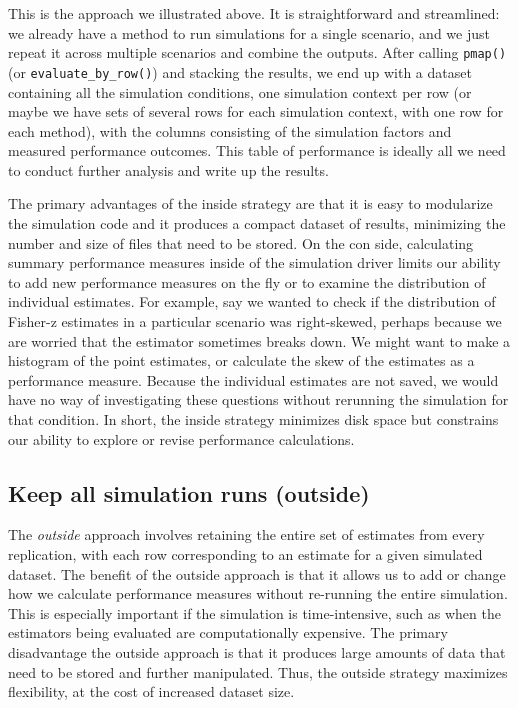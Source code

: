 \documentclass[
]{book}
\begin{document}
This is the approach we illustrated above. It is straightforward and streamlined: we already have a method to run simulations for a single scenario, and we just repeat it across multiple scenarios and combine the outputs.
After calling \texttt{pmap()} (or \texttt{evaluate\_by\_row()}) and stacking the results, we end up with a dataset containing all the simulation conditions, one simulation context per row (or maybe we have sets of several rows for each simulation context, with one row for each method), with the columns consisting of the simulation factors and measured performance outcomes.
This table of performance is ideally all we need to conduct further analysis and write up the results.

The primary advantages of the inside strategy are that it is easy to modularize the simulation code and it produces a compact dataset of results, minimizing the number and size of files that need to be stored.
On the con side, calculating summary performance measures inside of the simulation driver limits our ability to add new performance measures on the fly or to examine the distribution of individual estimates.
For example, say we wanted to check if the distribution of Fisher-z estimates in a particular scenario was right-skewed, perhaps because we are worried that the estimator sometimes breaks down.
We might want to make a histogram of the point estimates, or calculate the skew of the estimates as a performance measure.
Because the individual estimates are not saved, we would have no way of investigating these questions without rerunning the simulation for that condition.
In short, the inside strategy minimizes disk space but constrains our ability to explore or revise performance calculations.

\subsection{Keep all simulation runs (outside)}\label{keep-all-simulation-runs-outside}

The \emph{outside} approach involves retaining the entire set of estimates from every replication, with each row corresponding to an estimate for a given simulated dataset.
The benefit of the outside approach is that it allows us to add or change how we calculate performance measures without re-running the entire simulation.
This is especially important if the simulation is time-intensive, such as when the estimators being evaluated are computationally expensive.
The primary disadvantage the outside approach is that it produces large amounts of data that need to be stored and further manipulated.
Thus, the outside strategy maximizes flexibility, at the cost of increased dataset size.
\end{document}
